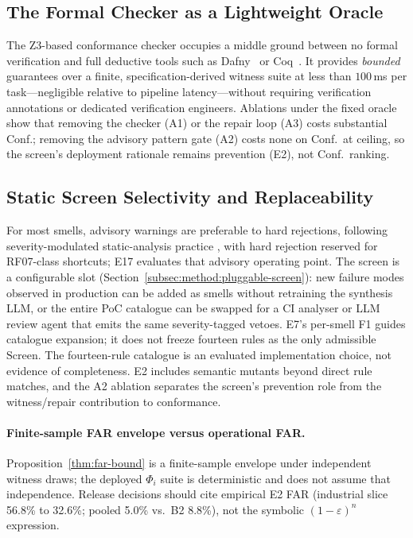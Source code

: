 \subsection{The Formal Checker as a Lightweight Oracle}

The Z3-based conformance checker occupies a middle ground between no formal
verification and full deductive tools such as Dafny~\citep{leino2010dafny}
or Coq~\citep{woodcock2009formalsurvey}.
It provides \emph{bounded} guarantees over a finite, specification-derived
witness suite at less than $100$\,ms per task---negligible relative to
pipeline latency---without requiring verification annotations or dedicated
verification engineers.
Ablations under the fixed oracle show that removing the checker (A1) or the
repair loop (A3) costs substantial Conf.; removing the advisory pattern gate
(A2) costs none on Conf.\ at ceiling, so the screen's deployment rationale
remains prevention (E2), not Conf.\ ranking.

\subsection{Static Screen Selectivity and Replaceability}

For most smells, advisory warnings are preferable to hard rejections,
following severity-modulated static-analysis practice
\cite{hovemeyer2004findbugs,ayewah2007findbugs}, with hard rejection reserved
for RF07-class shortcuts; E17 evaluates that advisory operating point.
The screen is a configurable slot
(Section~\ref{subsec:method:pluggable-screen}): new failure modes observed in
production can be added as smells without retraining the synthesis LLM, or the
entire PoC catalogue can be swapped for a CI analyser or LLM review agent that
emits the same severity-tagged vetoes.
E7's per-smell F1 guides catalogue expansion; it does not freeze fourteen
rules as the only admissible $\mathrm{Screen}$.
The fourteen-rule catalogue is an evaluated implementation choice,
not evidence of completeness.  E2 includes semantic mutants beyond direct
rule matches, and the A2 ablation separates the screen's prevention role from
the witness/repair contribution to conformance.

\paragraph{Finite-sample FAR envelope versus operational FAR.}
Proposition~\ref{thm:far-bound} is a finite-sample envelope under
independent witness draws; the deployed $\Phi_i$ suite is deterministic and
does not assume that independence.
Release decisions should cite empirical E2 FAR (industrial slice 56.8\% to
32.6\%; pooled 5.0\% vs.\ B2 8.8\%), not the symbolic
$(1-\varepsilon)^n$ expression.


